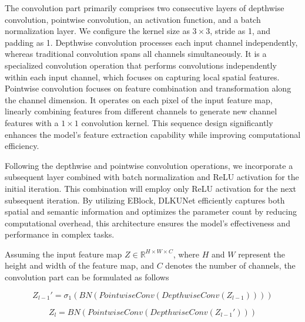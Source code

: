\documentclass[sn-mathphys-num]{sn-jnl}
\theoremstyle{thmstyleone}%
\theoremstyle{thmstyletwo}%
\theoremstyle{thmstylethree}%
\begin{document}
The convolution part primarily comprises two consecutive layers of depthwise convolution, pointwise convolution, an activation function, and a batch normalization layer.
We configure the kernel size as \(3\times 3\), stride as 1, and padding as 1.
Depthwise convolution processes each input channel independently, whereas traditional convolution spans all channels simultaneously.
It is a specialized convolution operation that performs convolutions independently within each input channel, which focuses on capturing local spatial features.
Pointwise convolution focuses on feature combination and transformation along the channel dimension.
It operates on each pixel of the input feature map, linearly combining features from different channels to generate new channel features with a \(1\times 1\) convolution kernel.
This sequence design significantly enhances the model's feature extraction capability while improving computational efficiency.

Following the depthwise and pointwise convolution operations, we incorporate a subsequent layer combined with batch normalization and ReLU activation for the initial iteration.
This combination will employ only ReLU activation for the next subsequent iteration.
By utilizing EBlock, DLKUNet efficiently captures both spatial and semantic information and optimizes the parameter count by reducing computational overhead, this architecture ensures the model's effectiveness and performance in complex tasks.

Assuming the input feature map \(Z\in\mathbb{R}^{H\times W\times C}\), where \(H\) and \(W\) represent the height and width of the feature map,
and \(C\) denotes the number of channels, the convolution part can be formulated as follows

\begin{equation}
    Z_{l-1}' = \sigma_1 \left(BN\left(PointwiseConv\left(DepthwiseConv\left(Z_{l-1}\right)\right)\right)\right)
    \label{eq1}
\end{equation}

\begin{equation}
    Z_l = BN\left(PointwiseConv\left(DepthwiseConv\left(Z_{l-1}'\right)\right)\right)
    \label{eq2}
\end{equation}
\end{document}
